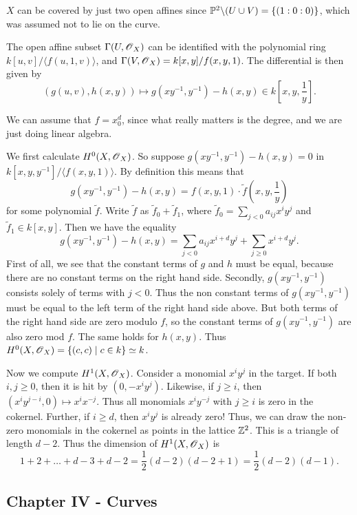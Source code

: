 \documentclass[11pt, english]{article}
\begin{document}
\begin{sol}
  $X$ can be covered by just two open affines since $\mathbb{P}^2 \backslash (U \cup V) = \{(1:0:0)\}$, which was assumed not to lie on the curve.

The open affine subset $\Gamma(U, \operatorname{\mathscr{O}}_X)$ can be identified with the polynomial ring $k[u,v]/\langle f(u,1,v) \rangle$, and $\Gamma(V,\operatorname{\mathscr{O}}_X) = k[x,y]/f(x,y,1)$. The differential is then given by 
\[
\left( g(u,v), h(x,y) \right) \mapsto g(xy^{-1},y^{-1})-h(x,y) \in k[x,y,\frac 1y].
\]

We can assume that $f=x_0^d$, since what really matters is the degree, and we are just doing linear algebra.

We first calculate $H^0(X,\operatorname{\mathscr{O}}_X)$. So suppose $g(xy^{-1}, y^{-1})-h(x,y)=0$ in $k[x,y,y^{-1}]/\langle f(x,y,1) \rangle$. By definition this means that
\[
g(xy^{-1},y^{-1}) - h(x,y) = f(x,y,1) \cdot \tilde f(x,y,\frac 1y)
\]
for some polynomial $\tilde f$. Write $\tilde f$ as $\tilde f_0 + \tilde f_1$, where $\tilde f_0=\sum_{j < 0} a_{ij} x^i y^j$ and $\tilde f_1 \in k[x,y]$. Then we have the equality
\[
g(xy^{-1},y^{-1}) - h(x,y) = \sum_{j < 0} a_{ij}x^{i+d}y^j + \sum_{j \geq 0} x^{i+d} y^j.
\]
First of all, we see that the constant terms of $g$ and $h$ must be equal, because there are no constant terms on the right hand side. Secondly, $g(xy^{-1},y^{-1})$ consists solely of terms with $j < 0$. Thus the non constant terms of  $g(xy^{-1},y^{-1})$ must be equal to the left term of the right hand side above. But both terms of the right hand side are zero modulo $f$, so the constant terms of $g(xy^{-1},y^{-1})$ are also zero mod $f$. The same holds for $h(x,y)$. Thus $H^0(X,\operatorname{\mathscr{O}}_X)= \{ (c,c) \mid c \in k \} \simeq k$.

Now we compute $H^1(X,\operatorname{\mathscr{O}}_X)$. Consider a monomial $x^iy^j$ in the target. If both $i,j \geq 0$, then it is hit by $(0,-x^iy^j)$. Likewise, if $j \geq i$, then $(x^iy^{j-i},0) \mapsto x^i x^{-j}$. Thus all monomials $x^iy^{-j}$ with $j \geq i$ is zero in the cokernel. Further, if $i \geq d$, then $x^i y^j$ is already zero! Thus, we can draw the non-zero monomials in the cokernel as points in the lattice $\mathbb{Z}^2$. This is a triangle of length $d-2$. Thus the dimension of $H^1(X,\operatorname{\mathscr{O}}_X)$ is 
\[
1 + 2 + \ldots+ d-3 + d-2 = \frac 12 (d-2)(d-2+1) = \frac 12 (d-2)(d-1).
\]
\end{sol}

\subsection{Chapter IV - Curves}
\end{document}
